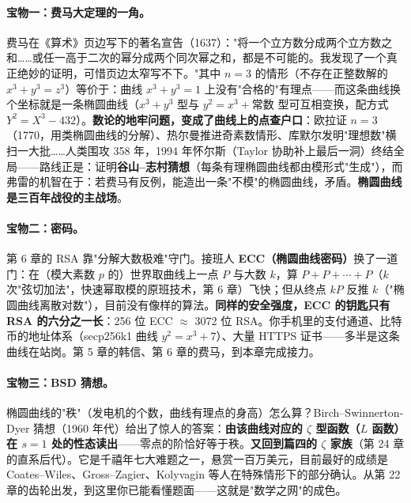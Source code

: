 \paragraph{宝物一：费马大定理的一角。}费马在《算术》页边写下的著名宣告（1637）："将一个立方数分成两个立方数之和……或任一高于二次的幂分成两个同次幂之和，都是不可能的。我发现了一个真正绝妙的证明，可惜页边太窄写不下。"其中 $n = 3$ 的情形（不存在正整数解的 $x^3 + y^3 = z^3$）等价于：曲线 $x^3 + y^3 = 1$ 上没有"合格的"有理点——而这条曲线换个坐标就是一条椭圆曲线（$x^3 + y^3$ 型与 $y^2 = x^3 + \text{常数}$ 型可互相变换，配方式 $Y^2 = X^3 - 432$）。\textbf{数论的地牢问题，变成了曲线上的点查户口}：欧拉证 $n=3$（1770，用类椭圆曲线的分解）、热尔曼推进奇素数情形、库默尔发明"理想数"横扫一大批……人类围攻 358 年，1994 年怀尔斯（Taylor 协助补上最后一洞）终结全局——路线正是：证明\textbf{谷山--志村猜想}（每条有理椭圆曲线都由模形式"生成"），而弗雷的机智在于：若费马有反例，能造出一条"不模"的椭圆曲线，矛盾。\textbf{椭圆曲线是三百年战役的主战场}。

\paragraph{宝物二：密码。}第 6 章的 RSA 靠"分解大数极难"守门。接班人 \textbf{ECC（椭圆曲线密码）}换了一道门：在（模大素数 $p$ 的）世界取曲线上一点 $P$ 与大数 $k$，算 $P + P + \cdots + P$（$k$ 次"弦切加法"，快速幂取模的原班技术，第 6 章）飞快；但从终点 $kP$ 反推 $k$（"椭圆曲线离散对数"），目前没有像样的算法。\textbf{同样的安全强度，ECC 的钥匙只有 RSA 的六分之一长}：256 位 ECC $\approx$ 3072 位 RSA。你手机里的支付通道、比特币的地址体系（secp256k1 曲线 $y^2 = x^3 + 7$）、大量 HTTPS 证书——多半是这条曲线在站岗。第 5 章的韩信、第 6 章的费马，到本章完成接力。

\paragraph{宝物三：BSD 猜想。}椭圆曲线的"秩"（发电机的个数，曲线有理点的身高）怎么算？Birch--Swinnerton-Dyer 猜想（1960 年代）给出了惊人的答案：\textbf{由该曲线对应的 $\zeta$ 型函数（$L$ 函数）在 $s = 1$ 处的性态读出}——零点的阶恰好等于秩。\textbf{又回到篇四的 $\zeta$ 家族}（第 24 章的直系后代）。它是千禧年七大难题之一，悬赏一百万美元，目前最好的成绩是 Coates--Wiles、Gross--Zagier、Kolyvagin 等人在特殊情形下的部分确认。从第 22 章的齿轮出发，到这里你已能看懂题面——这就是"数学之网"的成色。

